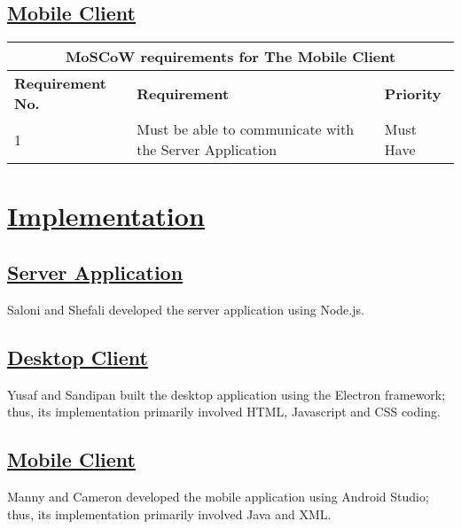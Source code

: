 \documentclass{article}
\begin{document}
\subsection{\underline{Mobile Client}}

\begin{tabular}{|p{4cm}|p{4cm}|p{4cm}|}
\hline
\multicolumn{3}{|c|}{\textbf{MoSCoW requirements for The Mobile Client}} \\
\hline
\textbf{Requirement No.} & \textbf{Requirement} & \textbf{Priority}\\
\hline
1 & Must be able to communicate with the Server Application & Must Have \\
\hline
\end{tabular}


\section{\underline{Implementation}}

\subsection{\underline{Server Application}}
Saloni and Shefali developed the server application using Node.js.

\subsection{\underline{Desktop Client}}
Yusaf and Sandipan built the desktop application using the Electron framework; thus, its implementation primarily involved HTML, Javascript and CSS coding.

\subsection{\underline{Mobile Client}}
Manny and Cameron developed the mobile application using Android Studio; thus, its implementation primarily involved Java and XML.
\end{document}
